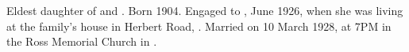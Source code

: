 
Eldest daughter of  and .\cite{WestAust1928}
Born 1904.\cite{BMD_WA_birth_1904_Perth}
Engaged to , June 1926,
when she was living at the family's house in Herbert Road, .\cite{JeanRobertAgnewEngagement}
Married on 10 March 1928,\cite{WestAust1928}
at 7PM in the Ross Memorial Church in .
